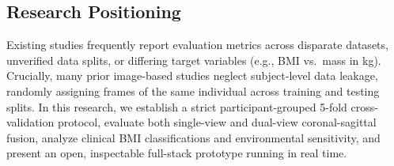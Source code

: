 \documentclass[conference]{IEEEtran}
\begin{document}
\subsection{Research Positioning}
Existing studies frequently report evaluation metrics across disparate datasets, unverified data splits, or differing target variables (e.g., BMI vs.~mass in kg). Crucially, many prior image-based studies neglect subject-level data leakage, randomly assigning frames of the same individual across training and testing splits. In this research, we establish a strict participant-grouped 5-fold cross-validation protocol, evaluate both single-view and dual-view coronal-sagittal fusion, analyze clinical BMI classifications and environmental sensitivity, and present an open, inspectable full-stack prototype running in real time.

\end{document}
